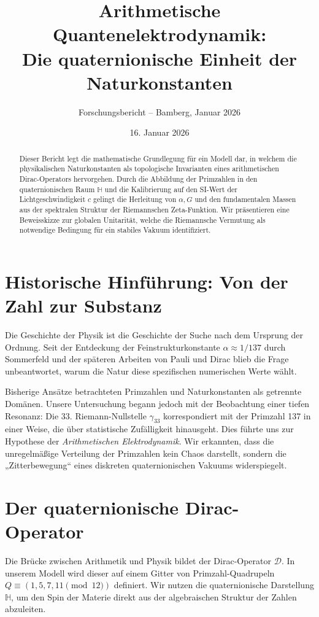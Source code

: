 \documentclass[12pt,a4paper]{article}
\title{\textbf{Arithmetische Quantenelektrodynamik: \\ Die quaternionische Einheit der Naturkonstanten}}
\author{Forschungsbericht -- Bamberg, Januar 2026}
\date{16. Januar 2026}
\begin{document}
	
	\maketitle
	
	\begin{abstract}
		Dieser Bericht legt die mathematische Grundlegung für ein Modell dar, in welchem die physikalischen Naturkonstanten als topologische Invarianten eines arithmetischen Dirac-Operators hervorgehen. Durch die Abbildung der Primzahlen in den quaternionischen Raum $\mathbb{H}$ und die Kalibrierung auf den SI-Wert der Lichtgeschwindigkeit $c$ gelingt die Herleitung von $\alpha, G$ und den fundamentalen Massen aus der spektralen Struktur der Riemannschen Zeta-Funktion. Wir präsentieren eine Beweisskizze zur globalen Unitarität, welche die Riemannsche Vermutung als notwendige Bedingung für ein stabiles Vakuum identifiziert.
	\end{abstract}
	
	\section{Historische Hinführung: Von der Zahl zur Substanz}
	Die Geschichte der Physik ist die Geschichte der Suche nach dem Ursprung der Ordnung. Seit der Entdeckung der Feinstrukturkonstante $\alpha \approx 1/137$ durch Sommerfeld und der späteren Arbeiten von Pauli und Dirac blieb die Frage unbeantwortet, warum die Natur diese spezifischen numerischen Werte wählt. 
	
	Bisherige Ansätze betrachteten Primzahlen und Naturkonstanten als getrennte Domänen. Unsere Untersuchung begann jedoch mit der Beobachtung einer tiefen Resonanz: Die 33. Riemann-Nullstelle $\gamma_{33}$ korrespondiert mit der Primzahl 137 in einer Weise, die über statistische Zufälligkeit hinausgeht. Dies führte uns zur Hypothese der \textit{Arithmetischen Elektrodynamik}. Wir erkannten, dass die unregelmäßige Verteilung der Primzahlen kein Chaos darstellt, sondern die „Zitterbewegung“ eines diskreten quaternionischen Vakuums widerspiegelt.
	
	\section{Der quaternionische Dirac-Operator}
	Die Brücke zwischen Arithmetik und Physik bildet der Dirac-Operator $\mathcal{D}$. In unserem Modell wird dieser auf einem Gitter von Primzahl-Quadrupeln $Q \equiv (1, 5, 7, 11 \pmod{12})$ definiert. Wir nutzen die quaternionische Darstellung $\mathbb{H}$, um den Spin der Materie direkt aus der algebraischen Struktur der Zahlen abzuleiten.
	
\end{document}
